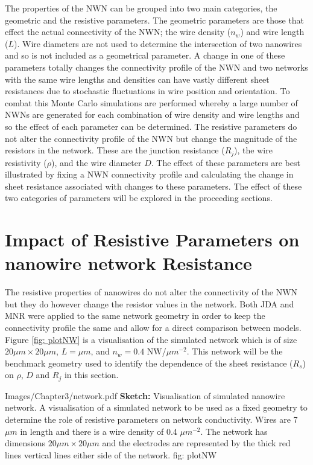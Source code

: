The properties of the NWN can be grouped into two main categories, the geometric and the resistive parameters. The geometric parameters are those that effect the actual connectivity of the NWN; the wire density ($n_w$) and wire length ($L$). Wire diameters are not used to determine the intersection of two nanowires and so is not included as a geometrical parameter. A change in one of these parameters totally changes the connectivity profile of the NWN and two networks with the same wire lengths and densities can have vastly different sheet resistances due to stochastic fluctuations in wire position and orientation. To combat this Monte Carlo simulations are performed whereby a large number of NWNs are generated for each combination of wire density and wire lengths and so the effect of each parameter can be determined. The resistive parameters do not alter the connectivity profile of the NWN but change the magnitude of the resistors in the network. These are the junction resistance ($R_j$), the wire resistivity ($\rho$), and the wire diameter $D$. The effect of these parameters are best illustrated by fixing a NWN connectivity profile and calculating the change in sheet resistance associated with changes to these parameters. The effect of these two categories of parameters will be explored in the proceeding sections. 
\section{Impact of Resistive Parameters on nanowire network Resistance}
\label{Sec: Resistive properties}
The resistive properties of nanowires do not alter the connectivity of the NWN but they do however change the resistor values in the network. Both JDA and MNR were applied to the same network geometry in order to keep the connectivity profile the same and allow for a direct comparison between models. Figure \ref{fig: plotNW} is a visualisation of the simulated network which is of size $20 \mu m \times 20 \mu m$, $L=\mu m$, and $n_w = 0.4$ NW/$\mu m^{-2}$. This network will be the benchmark geometry used to identify the dependence of the sheet resistance ($R_s$) on $\rho$, $D$ and $R_j$ in this section.

{Images/Chapter3/network.pdf}
{\textbf{Sketch:} Visualisation of simulated nanowire network.}
{A visualisation of a simulated network to be used as a fixed geometry to determine the role of resistive parameters on network conductivity. Wires are 7 $\mu m$ in length and there is a wire density of 0.4 $\mu m^{-2}$. The network has dimensions $20 \mu m \times 20 \mu m$ and the electrodes are represented by the thick red lines vertical lines either side of the network.}
{fig: plotNW}
